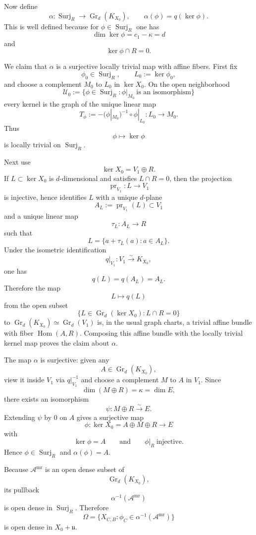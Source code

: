\documentclass[
  11pt,
]{article}
\begin{document}
Now define \[
\alpha:\operatorname{Surj}_R\to \operatorname{Gr}_d(K_{X_0}),
\qquad
\alpha(\phi)=q(\ker \phi).
\] This is well defined because for \(\phi\in \operatorname{Surj}_R\)
one has \[
\dim \ker \phi=c_1-\kappa=d
\] and \[
\ker \phi\cap R=0.
\]

We claim that \(\alpha\) is a surjective locally trivial map with affine
fibers. First fix \[
\phi_0\in \operatorname{Surj}_R,
\qquad
L_0:=\ker \phi_0,
\] and choose a complement \(M_0\) to \(L_0\) in \(\ker X_0\). On the
open neighborhood \[
\mathcal U_0:=
\{\phi\in \operatorname{Surj}_R:\phi|_{M_0}\ \text{is an isomorphism}\}
\] every kernel is the graph of the unique linear map \[
T_\phi:=-(\phi|_{M_0})^{-1}\circ \phi|_{L_0}:L_0\to M_0.
\] Thus \[
\phi\longmapsto \ker \phi
\] is locally trivial on \(\operatorname{Surj}_R\).

Next use \[
\ker X_0=V_1\oplus R.
\] If \(L\subset \ker X_0\) is \(d\)-dimensional and satisfies
\(L\cap R=0\), then the projection \[
\operatorname{pr}_{V_1}:L\to V_1
\] is injective, hence identifies \(L\) with a unique \(d\)-plane \[
A_L:=\operatorname{pr}_{V_1}(L)\subset V_1
\] and a unique linear map \[
\tau_L:A_L\to R
\] such that \[
L=\{a+\tau_L(a):a\in A_L\}.
\] Under the isometric identification \[
q|_{V_1}:V_1\xrightarrow{\sim} K_{X_0},
\] one has \[
q(L)=q(A_L)=A_L.
\] Therefore the map \[
L\longmapsto q(L)
\] from the open subset \[
\{L\in \operatorname{Gr}_d(\ker X_0):L\cap R=0\}
\] to \(\operatorname{Gr}_d(K_{X_0})\simeq \operatorname{Gr}_d(V_1)\)
is, in the usual graph charts, a trivial affine bundle with fiber
\(\operatorname{Hom}(A,R)\). Composing this affine bundle with the
locally trivial kernel map proves the claim about \(\alpha\).

The map \(\alpha\) is surjective: given any \[
A\in \operatorname{Gr}_d(K_{X_0}),
\] view it inside \(V_1\) via \(q|_{V_1}^{-1}\) and choose a complement
\(M\) to \(A\) in \(V_1\). Since \[
\dim(M\oplus R)=\kappa=\dim E,
\] there exists an isomorphism \[
\psi:M\oplus R\xrightarrow{\sim} E.
\] Extending \(\psi\) by \(0\) on \(A\) gives a surjective map \[
\phi:\ker X_0=A\oplus M\oplus R\to E
\] with \[
\ker \phi=A
\qquad\text{and}\qquad
\phi|_R\ \text{injective}.
\] Hence \(\phi\in \operatorname{Surj}_R\) and \(\alpha(\phi)=A\).

Because \(\mathscr A^{\mathrm{mr}}\) is an open dense subset of \[
\operatorname{Gr}_d(K_{X_0}),
\] its pullback \[
\alpha^{-1}(\mathscr A^{\mathrm{mr}})
\] is open dense in \(\operatorname{Surj}_R\). Therefore \[
\Omega
=
\{X_{C,B}:\phi_C\in \alpha^{-1}(\mathscr A^{\mathrm{mr}})\}
\] is open dense in \(X_0+\mathfrak u\).
\end{document}
